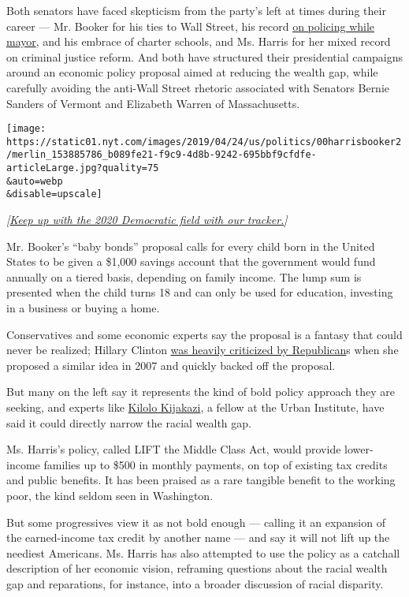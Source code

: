 Both senators have faced skepticism from the party's left at times
during their career --- Mr. Booker for his ties to Wall Street, his
record
\href{https://www.nytimes.com/2019/03/27/us/politics/cory-booker-2020-criminal-justice.html}{on
policing while mayor}, and his embrace of charter schools, and Ms.
Harris for her mixed record on criminal justice reform. And both have
structured their presidential campaigns around an economic policy
proposal aimed at reducing the wealth gap, while carefully avoiding the
anti-Wall Street rhetoric associated with Senators Bernie Sanders of
Vermont and Elizabeth Warren of Massachusetts.

\texttt{[image: https://static01.nyt.com/images/2019/04/24/us/politics/00harrisbooker2/merlin\_153885786\_b089fe21-f9c9-4d8b-9242-695bbf9cfdfe-articleLarge.jpg?quality=75\\\&auto=webp\\\&disable=upscale]}

\emph{{[}}\href{https://www.nytimes.com/interactive/2019/us/politics/2020-presidential-candidates.html?action=click\&module=inline\&pgtype=Article}{\emph{Keep
up with the 2020 Democratic field with our tracker.}}\emph{{]}}

Mr. Booker's ``baby bonds'' proposal calls for every child born in the
United States to be given a \$1,000 savings account that the government
would fund annually on a tiered basis, depending on family income. The
lump sum is presented when the child turns 18 and can only be used for
education, investing in a business or buying a home.

Conservatives and some economic experts say the proposal is a fantasy
that could never be realized; Hillary Clinton
\href{http://politicalticker.blogs.cnn.com/2007/10/05/giuliani-attacks-clinton-over-5000-baby-bond/}{was
heavily criticized by Republican}s when she proposed a similar idea in
2007 and quickly backed off the proposal.

But many on the left say it represents the kind of bold policy approach
they are seeking, and experts like
\href{https://www.urban.org/author/kilolo-kijakazi}{Kilolo Kijakazi}, a
fellow at the Urban Institute, have said it could directly narrow the
racial wealth gap.

Ms. Harris's policy, called LIFT the Middle Class Act, would provide
lower-income families up to \$500 in monthly payments, on top of
existing tax credits and public benefits. It has been praised as a rare
tangible benefit to the working poor, the kind seldom seen in
Washington.

But some progressives view it as not bold enough --- calling it an
expansion of the earned-income tax credit by another name --- and say it
will not lift up the neediest Americans. Ms. Harris has also attempted
to use the policy as a catchall description of her economic vision,
reframing questions about the racial wealth gap and reparations, for
instance, into a broader discussion of racial disparity.

